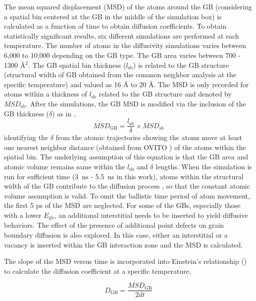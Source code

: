 \documentclass[review]{elsarticle}
\begin{document}
The mean squared displacement (MSD) of the atoms around the GB (considering a spatial bin centered at the GB in the middle of the simulation box) is calculated as a function of time to obtain diffusion coefficients. To obtain statistically significant results, six different simulations are performed at each temperature. The number of atoms in the diffusivity simulations varies between 6,000 to 10,000 depending on the GB type. The GB area varies between 700 - 1300 {\AA${^2}$}. The GB spatial bin thickness ($l_{\mathrm{sb}}$) is related to the GB structure (structural width of GB \cite{keblinski1999self} obtained from the common neighbor analysis at the specific temperature) and valued as 16 {\AA} to 20 {\AA}. The MSD is only recorded for atoms within a thickness of $l_{\mathrm{sb}}$ related to the GB structure and denoted by $MSD_{\mathrm{sb}}$. After the simulations, the GB MSD is modified via the inclusion of the GB thickness ($\delta$) as in  \cite{USi_diffusion}, 
%
\begin{equation}
\label{eq:dim}
MSD_{\mathrm{GB}} =\frac{l_{\mathrm{sb}}}{\delta} \times MSD_{\mathrm{sb}}
\end{equation}
%
identifying the $\delta$ from the atomic trajectories showing the atoms move at least one nearest neighbor distance (obtained from OVITO \cite{ovito}) of the atoms within the spatial bin. The underlying assumption of this equation is that the GB area and atomic volume remains same within the $l_{\mathrm{sb}}$ and $\delta$ lengths. When the simulation is run for sufficient time (3~ns - 5.5~ns in this work), atoms within the structural width of the GB contribute to the diffusion process \cite{keblinski1999self}, so that the constant atomic volume assumption is valid. To omit the ballistic time period of atom movement, the first 5 ps of the MSD are neglected. For some of the GBs, especially those with a lower $E_{\mathrm{gb}}$, an additional interstitial needs to be inserted to yield diffusive behaviors. The effect of the presence of additional point defects on grain boundary diffusion is also explored. In this case, either an interstitial or a vacancy is inserted within the GB interaction zone and the MSD is calculated.

\par The slope of the MSD versus time is incorporated into Einstein's relationship () to calculate the diffusion coefficient at a specific temperature,

\begin{equation}
\label{eq:ein}
D_{\mathrm{GB}} = \frac{MSD_{\mathrm{GB}}}{2dt}
\end{equation}
\end{document}
